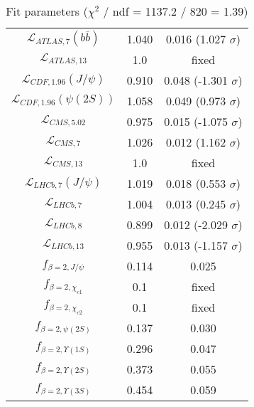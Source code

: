 \begin{table}[h!]
\begin{tabular}{c|c|c}
$\mathcal L_{ATLAS,7}(b\overline b)$ & 1.040 & 0.016 (1.027 $\sigma$) \\
$\mathcal L_{ATLAS,13}$ & 1.0 & fixed \\
$\mathcal L_{CDF,1.96}(J/\psi)$ & 0.910 & 0.048 (-1.301 $\sigma$) \\
$\mathcal L_{CDF,1.96}(\psi(2S))$ & 1.058 & 0.049 (0.973 $\sigma$) \\
$\mathcal L_{CMS,5.02}$ & 0.975 & 0.015 (-1.075 $\sigma$) \\
$\mathcal L_{CMS,7}$ & 1.026 & 0.012 (1.162 $\sigma$) \\
$\mathcal L_{CMS,13}$ & 1.0 & fixed \\
$\mathcal L_{LHCb,7}(J/\psi)$ & 1.019 & 0.018 (0.553 $\sigma$) \\
$\mathcal L_{LHCb,7}$ & 1.004 & 0.013 (0.245 $\sigma$) \\
$\mathcal L_{LHCb,8}$ & 0.899 & 0.012 (-2.029 $\sigma$) \\
$\mathcal L_{LHCb,13}$ & 0.955 & 0.013 (-1.157 $\sigma$) \\
$f_{\beta=2,J/\psi}$ & 0.114 & 0.025 \\
$f_{\beta=2,\chi_{c1}}$ & 0.1 & fixed \\
$f_{\beta=2,\chi_{c2}}$ & 0.1 & fixed \\
$f_{\beta=2,\psi(2S)}$ & 0.137 & 0.030 \\
$f_{\beta=2,\Upsilon(1S)}$ & 0.296 & 0.047 \\
$f_{\beta=2,\Upsilon(2S)}$ & 0.373 & 0.055 \\
$f_{\beta=2,\Upsilon(3S)}$ & 0.454 & 0.059 \\
\end{tabular}
\caption{Fit parameters ($\chi^2$ / ndf = 1137.2 / 820 = 1.39)}
\end{table}
